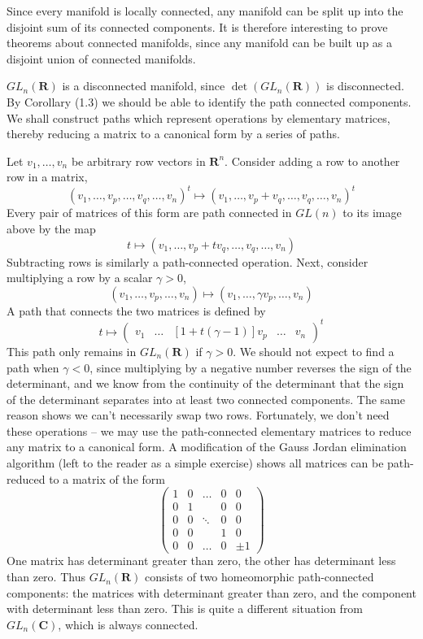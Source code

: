 Since every manifold is locally connected, any manifold can be split up into the disjoint sum of its connected components. It is therefore interesting to prove theorems about connected manifolds, since any manifold can be built up as a disjoint union of connected manifolds.

\begin{example}
    $GL_n(\mathbf{R})$ is a disconnected manifold, since $\det(GL_n(\mathbf{R}))$ is disconnected. By Corollary (1.3) we should be able to identify the path connected components. We shall construct paths which represent operations by elementary matrices, thereby reducing a matrix to a canonical form by a series of paths.

    Let $v_1, \dots, v_n$ be arbitrary row vectors in $\mathbf{R}^n$. Consider adding a row to another row in a matrix,
    \[ (v_1, \dots, v_p, \dots, v_q, \dots, v_n)^t \mapsto (v_1, \dots, v_p + v_q, \dots, v_q, \dots, v_n)^t \]
    Every pair of matrices of this form are path connected in $GL(n)$ to its image above by the map
    \[ t \mapsto (v_1, \dots, v_p + t v_q, \dots, v_q, \dots, v_n) \]
    Subtracting rows is similarly a path-connected operation. Next, consider multiplying a row by a scalar $\gamma > 0$,
    \[ (v_1, \dots, v_p, \dots, v_n) \mapsto (v_1, \dots, \gamma v_p, \dots, v_n) \]
    A path that connects the two matrices is defined by
    \[ t \mapsto \begin{pmatrix} v_1 & \dots & [1 + t(\gamma - 1)]v_p & \dots & v_n \end{pmatrix}^t \]
    This path only remains in $GL_n(\mathbf{R})$ if $\gamma > 0$. We should not expect to find a path when $\gamma < 0$, since multiplying by a negative number reverses the sign of the determinant, and we know from the continuity of the determinant that the sign of the determinant separates into at least two connected components. The same reason shows we can't necessarily swap two rows. Fortunately, we don't need these operations -- we may use the path-connected elementary matrices to reduce any matrix to a canonical form. A modification of the Gauss Jordan elimination algorithm (left to the reader as a simple exercise) shows all matrices can be path-reduced to a matrix of the form
    \[ \begin{pmatrix} 1 & 0 & \dots & 0 & 0 \\ 0 & 1 & & 0 & 0 \\ 0 & 0 & \ddots & 0 & 0 \\ 0 & 0 &  & 1 & 0 \\ 0 & 0 & \dots & 0 & \pm 1 \end{pmatrix} \]
    One matrix has determinant greater than zero, the other has determinant less than zero. Thus $GL_n(\mathbf{R})$ consists of two homeomorphic path-connected components: the matrices with determinant greater than zero, and the component with determinant less than zero. This is quite a different situation from $GL_n(\mathbf{C})$, which is always connected.
\end{example}







